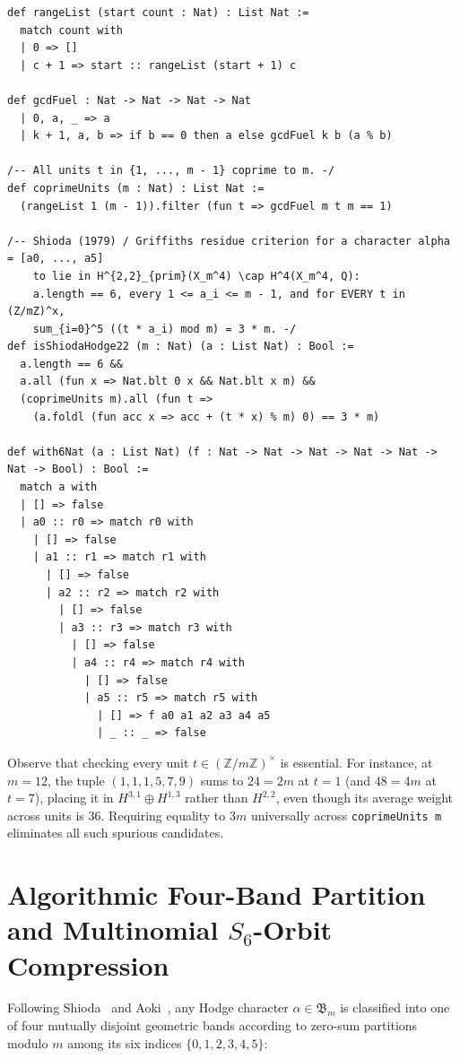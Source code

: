 \documentclass[11pt,a4paper]{article}
\begin{document}
\begin{lstlisting}[caption={Constructive unit enumeration and Shioda $(2,2)$ Galois weight predicate.}]
def rangeList (start count : Nat) : List Nat :=
  match count with
  | 0 => []
  | c + 1 => start :: rangeList (start + 1) c

def gcdFuel : Nat -> Nat -> Nat -> Nat
  | 0, a, _ => a
  | k + 1, a, b => if b == 0 then a else gcdFuel k b (a % b)

/-- All units t in {1, ..., m - 1} coprime to m. -/
def coprimeUnits (m : Nat) : List Nat :=
  (rangeList 1 (m - 1)).filter (fun t => gcdFuel m t m == 1)

/-- Shioda (1979) / Griffiths residue criterion for a character alpha = [a0, ..., a5]
    to lie in H^{2,2}_{prim}(X_m^4) \cap H^4(X_m^4, Q):
    a.length == 6, every 1 <= a_i <= m - 1, and for EVERY t in (Z/mZ)^x,
    sum_{i=0}^5 ((t * a_i) mod m) = 3 * m. -/
def isShiodaHodge22 (m : Nat) (a : List Nat) : Bool :=
  a.length == 6 &&
  a.all (fun x => Nat.blt 0 x && Nat.blt x m) &&
  (coprimeUnits m).all (fun t =>
    (a.foldl (fun acc x => acc + (t * x) % m) 0) == 3 * m)

def with6Nat (a : List Nat) (f : Nat -> Nat -> Nat -> Nat -> Nat -> Nat -> Bool) : Bool :=
  match a with
  | [] => false
  | a0 :: r0 => match r0 with
    | [] => false
    | a1 :: r1 => match r1 with
      | [] => false
      | a2 :: r2 => match r2 with
        | [] => false
        | a3 :: r3 => match r3 with
          | [] => false
          | a4 :: r4 => match r4 with
            | [] => false
            | a5 :: r5 => match r5 with
              | [] => f a0 a1 a2 a3 a4 a5
              | _ :: _ => false
\end{lstlisting}

Observe that checking every unit $t \in (\mathbb{Z}/m\mathbb{Z})^\times$ is essential. For instance, at $m = 12$, the tuple $(1, 1, 1, 5, 7, 9)$ sums to $24 = 2m$ at $t = 1$ (and $48 = 4m$ at $t = 7$), placing it in $H^{3,1} \oplus H^{1,3}$ rather than $H^{2,2}$, even though its average weight across units is $36$. Requiring equality to $3m$ universally across \texttt{coprimeUnits m} eliminates all such spurious candidates.

\section{Algorithmic Four-Band Partition and Multinomial \texorpdfstring{$S_6$}{S6}-Orbit Compression}

Following Shioda~\cite{Shioda1979} and Aoki~\cite{Aoki1983}, any Hodge character $\alpha \in \mathfrak{B}_m$ is classified into one of four mutually disjoint geometric bands according to zero-sum partitions modulo $m$ among its six indices $\{0, 1, 2, 3, 4, 5\}$:
\end{document}
